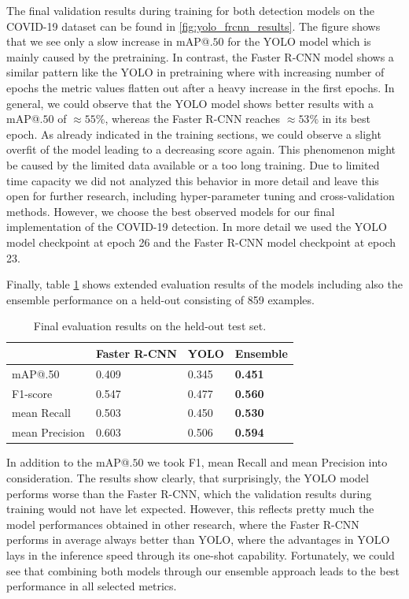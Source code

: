 The final validation results during training for both detection models on the COVID-19 dataset can be found in \ref{fig:yolo_frcnn_results}. The figure shows that we see only a slow increase in \ac{mAP}@$.50$ for the \ac{YOLO} model which is mainly caused by the pretraining. In contrast, the Faster \ac{R-CNN} model shows a similar pattern like the \ac{YOLO} in pretraining where with increasing number of epochs the metric values flatten out after a heavy increase in the first epochs. In general, we could observe that the \ac{YOLO} model shows better results with a \ac{mAP}@$.50$ of $\approx 55\%$, whereas the Faster \ac{R-CNN} reaches $\approx 53\%$ in its best epoch. As already indicated in the training sections, we could observe a slight overfit of the model leading to a decreasing score again. This phenomenon might be caused by the limited data available or a too long training. Due to limited time capacity we did not analyzed this behavior in more detail and leave this open for further research, including hyper-parameter tuning and cross-validation methods.
However, we choose the best observed models for our final implementation of the COVID-19 detection. In more detail we used the \ac{YOLO} model checkpoint at epoch 26 and the Faster \ac{R-CNN} model checkpoint at epoch 23.

Finally, table \ref{table:final_results} shows extended evaluation results of the models including also the ensemble performance on a held-out consisting of 859 examples. 
\begin{table}[h!]
	\begin{tabular}{l|l|l|l}
		&    Faster R-CNN          &         YOLO             &  Ensemble \\ \hline
		mAP@.50			& \multicolumn{1}{l|}{0.409} & \multicolumn{1}{l|}{0.345} & \textbf{0.451}  \\
		F1-score		& \multicolumn{1}{l|}{0.547} & \multicolumn{1}{l|}{0.477} & \textbf{0.560} \\
		mean Recall		& \multicolumn{1}{l|}{0.503} & \multicolumn{1}{l|}{0.450} & \textbf{0.530} \\
		mean Precision	& \multicolumn{1}{l|}{0.603} & \multicolumn{1}{l|}{0.506} & \textbf{0.594} \\
	\end{tabular}
	\centering
	\caption{Final evaluation results on the held-out test set.}
	\label{table:final_results}
\end{table}
In addition to the \ac{mAP}@$.50$ we took F1, mean Recall and mean Precision into consideration. The results show clearly, that surprisingly, the \ac{YOLO} model performs worse than the Faster \ac{R-CNN}, which the validation results during training would not have let expected. However, this reflects pretty much the model performances obtained in other research, where the Faster \ac{R-CNN} performs in average always better than \ac{YOLO}, where the advantages in \ac{YOLO} lays in the inference speed through its one-shot capability. Fortunately, we could see that combining both models through our ensemble approach leads to the best performance in all selected metrics.

